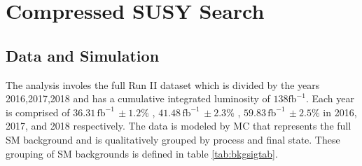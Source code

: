 
\setcounter{secnumdepth}{3}
\setcounter{tocdepth}{3}
\setlength{\parskip}{\smallskipamount}
\setlength{\parindent}{0pt}


\makeatletter


\providecommand{\tabularnewline}{\\}


\makeatother

%

\chapter{Compressed SUSY Search}


\section{ Data and Simulation}
The analysis involes the full Run II dataset which is divided by the years 2016,2017,2018 and has a cumulative integrated luminosity of $138 \text{fb}^{-1}$. Each year is comprised of $36.31 \, \text{fb}^{-1} \, \pm 1.2\%$ \cite{CMS:2021xjt}, $41.48 \, \text{fb}^{-1} \, \pm 2.3\%$ \cite{CMS:2018elu}, $59.83 \, \text{fb}^{-1} \, \pm2.5\%$ \cite{CMS:2019jhq} in 2016, 2017, and 2018 respectively. The data is modeled by MC that represents the full SM background and is qualitatively grouped by process and final state. These grouping of SM backgrounds is defined in table \ref{tab:bkgsigtab}.

